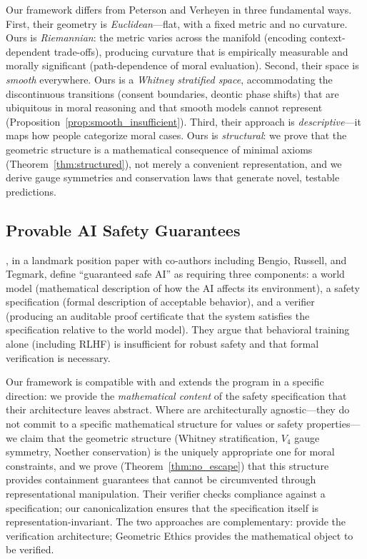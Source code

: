 \documentclass[12pt]{article}
\theoremstyle{definition}
\theoremstyle{remark}
\begin{document}
Our framework differs from Peterson and Verheyen in three fundamental ways. First, their geometry is \emph{Euclidean}---flat, with a fixed metric and no curvature. Ours is \emph{Riemannian}: the metric varies across the manifold (encoding context-dependent trade-offs), producing curvature that is empirically measurable and morally significant (path-dependence of moral evaluation). Second, their space is \emph{smooth} everywhere. Ours is a \emph{Whitney stratified space}, accommodating the discontinuous transitions (consent boundaries, deontic phase shifts) that are ubiquitous in moral reasoning and that smooth models cannot represent (Proposition~\ref{prop:smooth_insufficient}). Third, their approach is \emph{descriptive}---it maps how people categorize moral cases. Ours is \emph{structural}: we prove that the geometric structure is a mathematical consequence of minimal axioms (Theorem~\ref{thm:structured}), not merely a convenient representation, and we derive gauge symmetries and conservation laws that generate novel, testable predictions.

\subsection{Provable AI Safety Guarantees}

\citet{dalrymple2024}, in a landmark position paper with co-authors including Bengio, Russell, and Tegmark, define ``guaranteed safe AI'' as requiring three components: a world model (mathematical description of how the AI affects its environment), a safety specification (formal description of acceptable behavior), and a verifier (producing an auditable proof certificate that the system satisfies the specification relative to the world model). They argue that behavioral training alone (including RLHF) is insufficient for robust safety and that formal verification is necessary.

Our framework is compatible with and extends the \citeauthor{dalrymple2024} program in a specific direction: we provide the \emph{mathematical content} of the safety specification that their architecture leaves abstract. Where \citeauthor{dalrymple2024} are architecturally agnostic---they do not commit to a specific mathematical structure for values or safety properties---we claim that the geometric structure (Whitney stratification, $V_4$ gauge symmetry, Noether conservation) is the uniquely appropriate one for moral constraints, and we prove (Theorem~\ref{thm:no_escape}) that this structure provides containment guarantees that cannot be circumvented through representational manipulation. Their verifier checks compliance against a specification; our canonicalization ensures that the specification itself is representation-invariant. The two approaches are complementary: \citeauthor{dalrymple2024} provide the verification architecture; Geometric Ethics provides the mathematical object to be verified.
\end{document}
